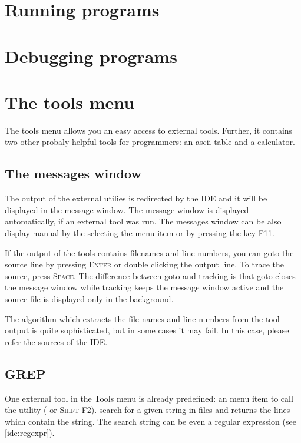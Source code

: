 \section{Running programs}
\label{ide:running}

\section{Debugging programs}

\section{The tools menu}
\label{ide:toolsmenu}
The tools menu allows you an easy access to external tools. Further,
it contains two other probaly helpful tools for programmers: an
ascii table and a calculator.

\subsection{The messages window}
The output of the external utilies is redirected by the IDE and it
will be displayed in the message window. The message window is
displayed automatically, if an external tool was run. The
messages window can be also display manual by the selecting the
menu item  or by pressing the key \textsc{F11}.

If the output of the tools contains filenames and line numbers,
you can goto the source line by pressing \textsc{Enter} or
double clicking the output line. To trace the source, press
\textsc{Space}. The difference between goto and tracking is that
goto closes the message window while tracking keeps the message
window active and the source file is displayed only in the background.

The algorithm which extracts the file names and line numbers from
the tool output is quite sophisticated, but in some cases it may
fail. In this case, please refer the sources of the IDE.

\subsection{GREP}
One external tool in the Tools menu is already predefined: an
menu item to call the  utility ( or
\textsc{Shift-F2}).  search for a given string in files and
returns the lines which contain the string. The search string can
be even a regular expression (see \ref{ide:regexpr}).

